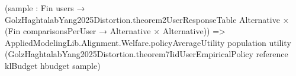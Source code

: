 \documentclass[10pt]{article}
\begin{document}
\begin{ReviewVerbatim}
                                                    (sample :
                                                      Fin users →
                                                        GolzHaghtalabYang2025Distortion.theorem2UserResponseTable
                                                            Alternative ×
                                                          (Fin comparisonsPerUser → Alternative × Alternative)) =>
                                                  AppliedModelingLib.Alignment.Welfare.policyAverageUtility population
                                                    utility
                                                    (GolzHaghtalabYang2025Distortion.theorem7IidUserEmpiricalPolicy
                                                      reference klBudget hbudget sample)
\end{ReviewVerbatim}
\end{document}
